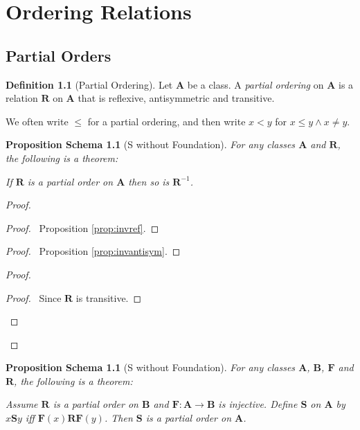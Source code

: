 \documentclass{book}
\let\qed\relax
\newtheorem{props}[ax]{Proposition Schema}
\theoremstyle{definition}
\newtheorem{df}[ax]{Definition}
\begin{document}
\chapter{Ordering Relations}

\section{Partial Orders}

\begin{df}[Partial Ordering]
Let $\mathbf{A}$ be a class. A \emph{partial ordering} on $\mathbf{A}$ is a relation $\mathbf{R}$ on $\mathbf{A}$ that is reflexive, antisymmetric and transitive.

We often write $\leq$ for a partial ordering, and then write $x < y$ for $x \leq y \wedge x \neq y$.
\end{df}

\begin{props}[S without Foundation]
\label{prop:invposet}
For any classes $\mathbf{A}$ and $\mathbf{R}$, the following is a theorem:

If $\mathbf{R}$ is a partial order on $\mathbf{A}$ then so is $\mathbf{R}^{-1}$.
\end{props}

\begin{proof}
\pf
{}
\begin{proof}
	\pf\ Proposition \ref{prop:invref}.
\end{proof}
\begin{proof}
	\pf\ Proposition \ref{prop:invantisym}.
\end{proof}
\begin{proof}
	\begin{proof}
		\pf\ Since $\mathbf{R}$ is transitive.
	\end{proof}
\end{proof}
\qed
\end{proof}

\begin{props}[S without Foundation]
\label{prop:subposet}
For any classes $\mathbf{A}$, $\mathbf{B}$, $\mathbf{F}$ and $\mathbf{R}$, the following is a theorem:

Assume $\mathbf{R}$ is a partial order on $\mathbf{B}$ and $\mathbf{F} : \mathbf{A} \rightarrow \mathbf{B}$ is injective. Define $\mathbf{S}$ on $\mathbf{A}$ by $x \mathbf{S} y$ iff $\mathbf{F}(x) \mathbf{R} \mathbf{F}(y)$. Then $\mathbf{S}$ is a partial order on $\mathbf{A}$.
\end{props}
\end{document}

